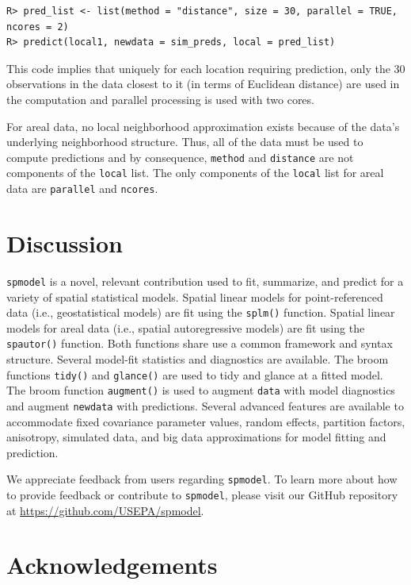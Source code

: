 \documentclass[10pt,letterpaper]{article}
\begin{document}
\begin{verbatim}
R> pred_list <- list(method = "distance", size = 30, parallel = TRUE, ncores = 2)
R> predict(local1, newdata = sim_preds, local = pred_list)
\end{verbatim}

This code implies that uniquely for each location requiring prediction,
only the 30 observations in the data closest to it (in terms of
Euclidean distance) are used in the computation and parallel processing
is used with two cores.

For areal data, no local neighborhood approximation exists because of
the data's underlying neighborhood structure. Thus, all of the data must
be used to compute predictions and by consequence, \texttt{method} and
\texttt{distance} are not components of the \texttt{local} list. The
only components of the \texttt{local} list for areal data are
\texttt{parallel} and \texttt{ncores}.

\hypertarget{sec:discussion}{%
\section{Discussion}\label{sec:discussion}}

\texttt{spmodel} is a novel, relevant contribution used to fit,
summarize, and predict for a variety of spatial statistical models.
Spatial linear models for point-referenced data (i.e., geostatistical
models) are fit using the \texttt{splm()} function. Spatial linear
models for areal data (i.e., spatial autoregressive models) are fit
using the \texttt{spautor()} function. Both functions share use a common
framework and syntax structure. Several model-fit statistics and
diagnostics are available. The broom functions \texttt{tidy()} and
\texttt{glance()} are used to tidy and glance at a fitted model. The
broom function \texttt{augment()} is used to augment \texttt{data} with
model diagnostics and augment \texttt{newdata} with predictions. Several
advanced features are available to accommodate fixed covariance
parameter values, random effects, partition factors, anisotropy,
simulated data, and big data approximations for model fitting and
prediction.

We appreciate feedback from users regarding \texttt{spmodel}. To learn
more about how to provide feedback or contribute to \texttt{spmodel},
please visit our GitHub repository at
\url{https://github.com/USEPA/spmodel}.

\hypertarget{acknowledgements}{%
\section*{Acknowledgements}\label{acknowledgements}}
\end{document}
